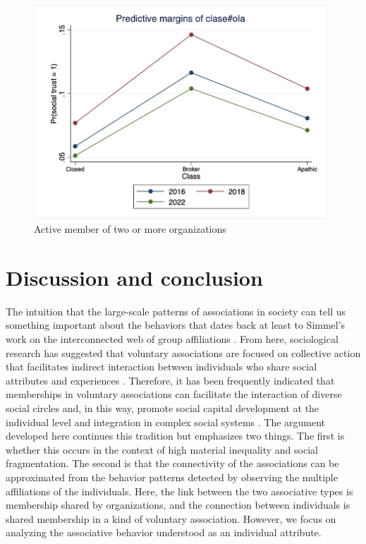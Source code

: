 


\begin{figure}[H]
    \centering
    \includegraphics[width=11cm]{output/marginal_effect.jpeg}
    \caption{Active member of two or more organizations}
    \label{fig:fig9}
\end{figure}



\section{Discussion and conclusion}

The intuition that the large-scale patterns of associations in society can tell us something important about the behaviors that dates back at least to Simmel's work on the interconnected web of group affiliations \parencite{centola_how_2018, simmel_conflict_1922}. From here, sociological research has suggested that voluntary associations are focused on collective action that facilitates indirect interaction between individuals who share social attributes and experiences \parencite{mcpherson_hypernetwork_1982}. Therefore, it has been frequently indicated that memberships in voluntary associations can facilitate the interaction of diverse social circles and, in this way, promote social capital development at the individual level \parencite{tindall_network_2012} and integration in complex social systems \parencite{paxton_association_2007}. The argument developed here continues this tradition but emphasizes two things. The first is whether this occurs in the context of high material inequality and social fragmentation. The second is that the connectivity of the associations can be approximated from the behavior patterns detected by observing the multiple affiliations of the individuals. Here, the link between the two associative types is membership shared by organizations, and the connection between individuals is shared membership in a kind of voluntary association. However, we focus on analyzing the associative behavior understood as an individual attribute.
\bigskip

